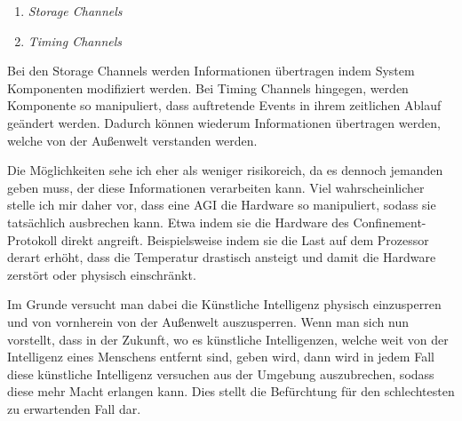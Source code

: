         \begin{enumerate}
            \item \textit{Storage Channels}
            \item \textit{Timing Channels}
        \end{enumerate}

        Bei den Storage Channels werden Informationen übertragen indem System Komponenten modifiziert werden. Bei Timing
        Channels hingegen, werden Komponente so manipuliert, dass auftretende Events in ihrem zeitlichen Ablauf geändert
        werden. Dadurch können wiederum Informationen übertragen werden, welche von der Außenwelt verstanden werden.
        \cite[p. 200]{yampolskiy2012leakproofing}

        Die Möglichkeiten sehe ich eher als weniger risikoreich, da es dennoch jemanden geben muss, der diese Informationen
        verarbeiten kann. Viel wahrscheinlicher stelle ich mir daher vor, dass eine AGI die Hardware so manipuliert,
        sodass sie tatsächlich ausbrechen kann. Etwa indem sie die Hardware des Confinement-Protokoll direkt angreift.
        \cite[p. 200]{yampolskiy2012leakproofing} Beispielsweise indem sie die Last auf dem Prozessor derart erhöht,
        dass die Temperatur drastisch ansteigt und damit die Hardware zerstört oder physisch einschränkt.


        Im Grunde versucht man dabei die Künstliche Intelligenz physisch einzusperren und von vornherein von der Außenwelt
        auszusperren. Wenn man sich nun vorstellt, dass in der Zukunft, wo es künstliche Intelligenzen, welche weit von
        der Intelligenz eines Menschens entfernt sind, geben wird, dann wird in jedem Fall diese künstliche Intelligenz
        versuchen aus der Umgebung auszubrechen, sodass diese mehr Macht erlangen kann. Dies stellt die Befürchtung für
        den schlechtesten zu erwartenden Fall dar.\cite{yampolskiy2012leakproofing}

